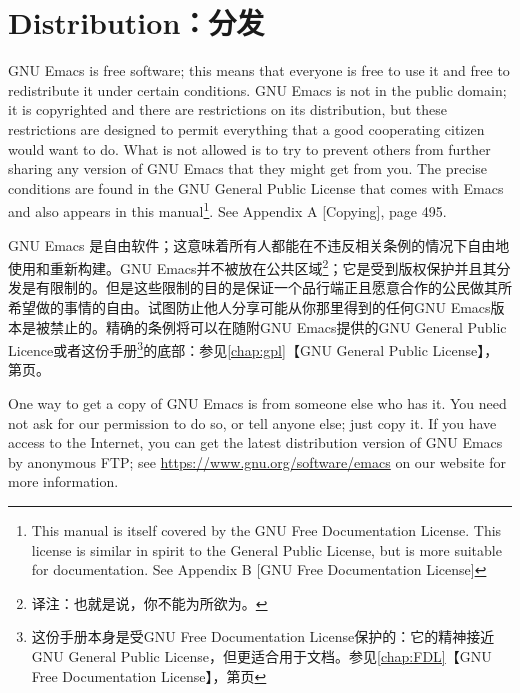 \chapter{Distribution：分发}
GNU Emacs is free software; this means that everyone is free to use it and free to redistribute it under certain conditions. GNU Emacs is not in the public domain; it is copyrighted and there are restrictions on its distribution, but these restrictions are designed to permit everything that a good cooperating citizen would want to do. What is not allowed is to try to prevent others from further sharing any version of GNU Emacs that they might get from you. The precise conditions are found in the GNU General Public License that comes with Emacs and also appears in this manual\footnote{This manual is itself covered by the GNU Free Documentation License. This license is similar in spirit to the General Public License, but is more suitable for documentation. See Appendix B [GNU Free Documentation License]}. See Appendix A [Copying], page 495.\par
GNU Emacs 是自由软件；这意味着所有人都能在不违反相关条例的情况下自由地使用和重新构建。GNU Emacs并不被放在公共区域\footnote{译注：也就是说，你不能为所欲为。}；它是受到版权保护并且其分发是有限制的。但是这些限制的目的是保证一个品行端正且愿意合作的公民做其所希望做的事情的自由。试图防止他人分享可能从你那里得到的任何GNU Emacs版本是被禁止的。精确的条例将可以在随附GNU Emacs提供的GNU General Public Licence或者这份手册\footnote{这份手册本身是受GNU Free Documentation License保护的：它的精神接近GNU General Public License，但更适合用于文档。参见\ref{chap:FDL}【GNU Free Documentation License】，第\pageref{chap:FDL}页}的底部：参见\ref{chap:gpl}【GNU General Public License】，第\pageref{chap:gpl}页。\par
One way to get a copy of GNU Emacs is from someone else who has it. You need not ask for our permission to do so, or tell anyone else; just copy it. If you have access to the Internet, you can get the latest distribution version of GNU Emacs by anonymous FTP; see \url{https://www.gnu.org/software/emacs} on our website for more information.\par
